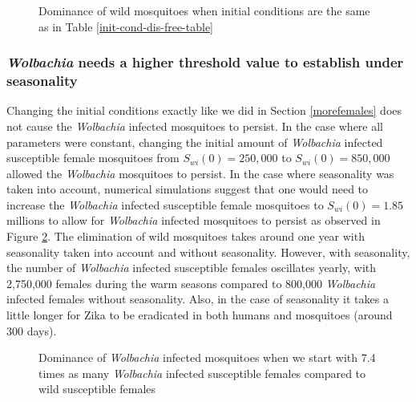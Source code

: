 \documentclass{ws-rv9x6}
\begin{document}
\begin{figure}[H]
    \centering
    
    \caption{Dominance of wild mosquitoes when initial conditions are the same as in Table \ref{init-cond-dis-free-table}}
    \label{nonautfig1}
\end{figure}


\subsubsection{\textit{Wolbachia} needs a higher threshold value to establish under seasonality }
Changing the initial conditions exactly like we did in Section \ref{morefemales} does not cause the \textit{Wolbachia} infected mosquitoes to persist. In the case where all parameters were constant, changing the initial amount of \textit{Wolbachia} infected susceptible female mosquitoes from $S_{wi}(0)=250,000$ to $S_{wi}(0)=850,000$ allowed the \textit{Wolbachia} mosquitoes to persist. In the case where seasonality was taken into account, numerical simulations suggest that one would need to increase the \textit{Wolbachia} infected susceptible female mosquitoes to $S_{wi}(0)=1.85$ millions to allow for \textit{Wolbachia} infected mosquitoes to persist as observed in Figure \ref{nonautfig2}. The elimination of wild mosquitoes takes around one year with seasonality taken into account and without seasonality. However, with seasonality, the number of \textit{Wolbachia} infected susceptible females oscillates yearly, with 2,750,000 females during the warm seasons compared to 800,000 \textit{Wolbachia} infected females without seasonality. Also, in the case of seasonality it takes a little longer for Zika to be eradicated in both humans and mosquitoes (around 300 days).

\begin{figure}[H]
    \centering
    
    \caption{Dominance of \textit{Wolbachia} infected mosquitoes when we start with 7.4 times as many \textit{Wolbachia} infected susceptible females compared to wild susceptible females}
    \label{nonautfig2}
\end{figure}
\end{document}
